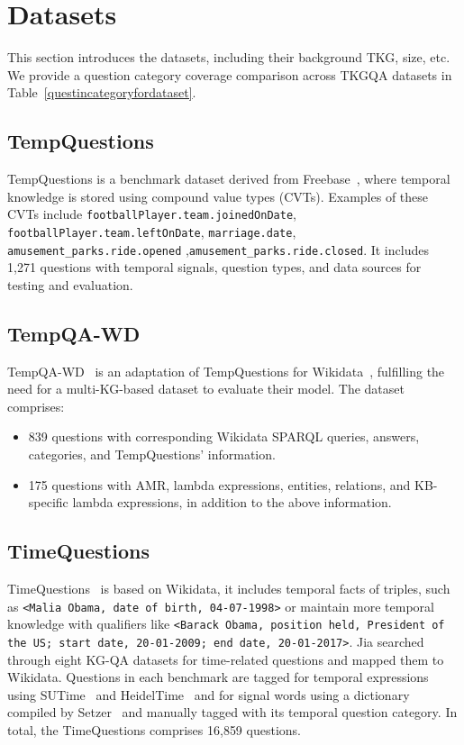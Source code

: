 
\section{Datasets}
\label{sec-datasets}
This section introduces the datasets, including their background TKG, size, etc. We provide a question category coverage comparison across TKGQA datasets in Table~\ref{questincategoryfordataset}.


\subsection{TempQuestions} TempQuestions \cite{jiaTempQuestionsBenchmarkTemporal2018} is a benchmark dataset derived from Freebase~\cite{bollackerFreebaseCollaborativelyCreated2008}, where temporal knowledge is stored using compound value types (CVTs). Examples of these CVTs include \texttt{footballPlayer.team.joinedOnDate}, \texttt{footballPlayer.team.leftOnDate},
\texttt{marriage.date},
\texttt{amusement\_parks.ride.opened}	,\texttt{amusement\_parks.ride.closed}.
It includes 1,271 questions with temporal signals, question types, and data sources for testing and evaluation.

\subsection{\textbf{TempQA-WD}} TempQA-WD~\cite{neelamSYGMASystemGeneralizable2021} 
is an adaptation of TempQuestions for Wikidata~\cite{vrandecicWikidataFreeCollaborative2014}, fulfilling the need for a multi-KG-based dataset to evaluate their model.
The dataset comprises:
\begin{itemize}
    \item 839 questions with corresponding Wikidata SPARQL queries, answers, categories, and TempQuestions' information.
    \item 175 questions with AMR, lambda expressions, entities, relations, and KB-specific lambda expressions, in addition to the above information.
\end{itemize}


\subsection{\textbf{TimeQuestions}}TimeQuestions~\cite{jiaComplexTemporalQuestion2021}
is based on Wikidata, it includes temporal facts of triples, such as 
\texttt{<Malia Obama, date of birth, 04-07-1998>} or maintain more temporal knowledge with qualifiers like
\texttt{<Barack Obama, position held, President of the US; start date, 20-01-2009; end date, 20-01-2017>}. 
Jia searched through eight KG-QA datasets for time-related questions and mapped them to Wikidata. Questions in each benchmark are tagged for temporal expressions using SUTime~\cite{changSUTIMELibraryRecognizing} and HeidelTime~\cite{strotgenHeidelTimeHighQuality2010} and for signal words using a dictionary compiled by Setzer~\cite{setzerTemporalInformationNewswire2001a} and manually tagged with its temporal question category.
In total, the TimeQuestions comprises 16,859 questions.


